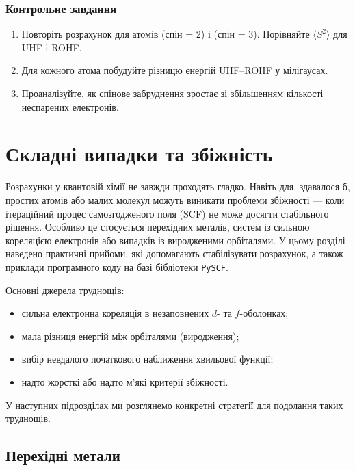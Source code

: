 \subsubsection{Контрольне завдання}

\begin{enumerate}
    \item Повторіть розрахунок для атомів  (спін = 2) і  (спін = 3).
          Порівняйте $\langle S^2 \rangle$ для UHF і ROHF.
    \item Для кожного атома побудуйте різницю енергій UHF–ROHF у мілігаусах.
    \item Проаналізуйте, як спінове забруднення зростає зі збільшенням кількості неспарених електронів.
\end{enumerate}



\section{Складні випадки та збіжність}

Розрахунки у квантовій хімії не завжди проходять гладко. Навіть для, здавалося б, простих атомів або малих молекул можуть виникати проблеми збіжності --- коли ітераційний процес самозгодженого поля (SCF) не може досягти стабільного рішення.
Особливо це стосується перехідних металів, систем із сильною кореляцією електронів або випадків із виродженими орбіталями.
У цьому розділі наведено практичні прийоми, які допомагають стабілізувати розрахунок, а також приклади програмного коду на базі бібліотеки \texttt{PySCF}.


Основні джерела труднощів:
\begin{itemize}
    \item сильна електронна кореляція в незаповнених $d$- та $f$-оболонках;
    \item мала різниця енергій між орбіталями (виродження);
    \item вибір невдалого початкового наближення хвильової функції;
    \item надто жорсткі або надто м’які критерії збіжності.
\end{itemize}

У наступних підрозділах ми розглянемо конкретні стратегії для подолання таких труднощів.

\subsection{Перехідні метали}


